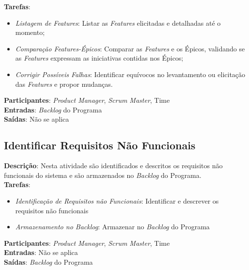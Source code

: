   \textbf{Tarefas}:
  \begin{itemize}
   \item \indent \textit{Listagem de \textit{Features}}: Listar as \textit{Features} elicitadas e detalhadas até o momento;

   \item \indent \textit{Comparação \textit{Features}-Épicos}: Comparar as \textit{Features} e os Épicos, validando se as \textit{Features} expressam as iniciativas contidas nos Épicos;

   \item \indent \textit{Corrigir Possíveis Falhas}: Identificar equívocos no levantamento ou elicitação das \textit{Features} e propor mudanças.
  \end{itemize}

  \textbf{Participantes}: \textit{Product Manager}, \textit{Scrum Master}, Time \\

  \textbf{Entradas}: \textit{Backlog} do Programa \\

  \textbf{Saídas}:  Não se aplica\\

\subsection{Identificar Requisitos Não Funcionais}
  \textbf{Descrição}: Nesta atividade são identificados e descritos os requisitos não funcionais do sistema e são armazenados no \textit{Backlog} do Programa.  \\

  \textbf{Tarefas}:
  \begin{itemize}
   \item \indent \textit{Identificação de Requisitos não Funcionais}: Identificar e descrever os requisitos não funcionais

   \item \indent \textit{Armazenamento no \textit{Backlog}}: Armazenar no \textit{Backlog} do Programa
  \end{itemize}

  \textbf{Participantes}: \textit{Product Manager}, \textit{Scrum Master}, Time \\

  \textbf{Entradas}:  Não se aplica\\

  \textbf{Saídas}:  \textit{Backlog} do Programa\\

